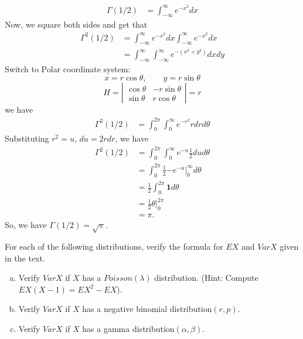 \documentclass[14pt]{elegantbook}
\begin{document}
\begin{solution}
\begin{enumerate}[(a)]
\begin{align*}
                \Gamma(1/2)&=\int_{-\infty}^{\infty} e^{-x^2}dx
            \end{align*}
            Now, we square both sides and get that 
            \begin{align*}
                \Gamma^2(1/2)&=\int_{-\infty}^{\infty} e^{-x^2}dx\int_{-\infty}^{\infty} e^{-x^2}dx\\
                &=\int_{-\infty}^{\infty}\int_{-\infty}^{\infty} e^{-(x^2+y^2)}dxdy
            \end{align*}
            Switch to Polar coordinate system: \[x=r\cos\theta, \qquad y=r\sin\theta\]
            \[
                H=\left|\begin{matrix}
                \cos\theta & -r\sin\theta\\
                \sin\theta & r\cos\theta
            \end{matrix}\right|=r
            \]
            we have
            \begin{align*}
                \Gamma^2(1/2)&=\int_{0}^{2\pi}\int_{0}^{\infty} e^{-r^2}rdrd\theta
            \end{align*}
            Substituting $r^2=u$, $du=2rdr$, we have
            \begin{align*}
                \Gamma^2(1/2)&=\int_{0}^{2\pi}\int_{0}^{\infty} e^{-u}\frac{1}{2}dud\theta\\
                &=\int_{0}^{2\pi}\frac{1}{2}\left.-e^{-u}\right|_0^\infty d\theta\\
                &=\frac{1}{2}\int_{0}^{2\pi}\mathbf{1}d\theta\\
                &=\frac{1}{2}\left.\theta\right|_0^{2\pi}\\
                &=\pi. 
            \end{align*}
            So, we have $\Gamma(1/2)=\sqrt{\pi}$.
        \end{enumerate}
    \end{solution}

    \setcounter{exer}{21}
    \begin{exercise}
        For each of the following distributions, verify the formula for $EX$ and $VarX$ given in the text. 
        \begin{enumerate}[(a)]
            \item Verify $VarX$ if $X$ has a $Poisson(\lambda)$ distribution. (Hint: Compute $EX(X-1)=EX^2-EX$). 
            \item Verify $VarX$ if $X$ has a negative binomial distribution$(r,p)$. 
            \item Verify $VarX$ if $X$ has a gamma distribution$(\alpha, \beta)$. 
        \end{enumerate}
    \end{exercise}
\end{document}
